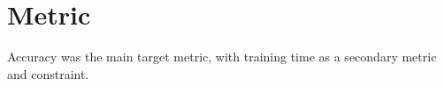 \section{Metric}
Accuracy was the main target metric, with training time as a secondary metric and constraint.














